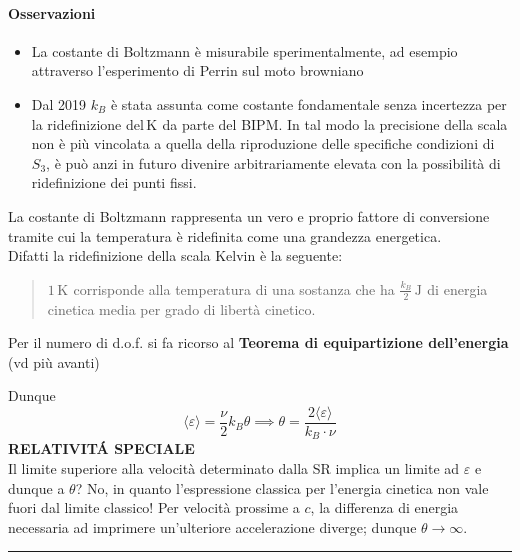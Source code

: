 \documentclass[10pt, oneside]{book}
\newcommand{\kelvin}[1]{\, \mathrm{K^{#1}}}
\newcommand{\joule}[1]{\, \mathrm{J^{#1}}}
\begin{document}
\paragraph{Osservazioni}
\begin{itemize}
\item La costante di Boltzmann è misurabile sperimentalmente, ad esempio attraverso l'esperimento di Perrin sul moto browniano
\item Dal 2019 $k_B$ è stata assunta come costante fondamentale senza incertezza per la ridefinizione del$\kelvin{}$ da parte del BIPM. In tal modo la precisione della scala non è più vincolata a quella della riproduzione delle specifiche condizioni di $S_3$, è può anzi in futuro divenire arbitrariamente elevata con la possibilità di ridefinizione dei punti fissi.
\end{itemize}
La costante di Boltzmann rappresenta un vero e proprio fattore di conversione tramite cui la temperatura è ridefinita come una grandezza energetica.
\\Difatti la ridefinizione della scala Kelvin è la seguente:
\begin{quote}
$1 \kelvin{}$ corrisponde alla temperatura di una sostanza che ha $\displaystyle \frac{k_B}{2} \joule{}$ di energia cinetica media per grado di libertà cinetico.
\end{quote}
Per il numero di d.o.f. si fa ricorso al \textbf{Teorema di equipartizione dell'energia} (vd più avanti)
\begin{center}

\end{center}
Dunque
\[\langle \varepsilon \rangle = \frac{\nu}{2} k_B \theta \implies \theta = \frac{2 \langle \varepsilon \rangle}{k_B \cdot \nu}\]
\textbf{RELATIVIT\'A SPECIALE }\hrulefill
\\Il limite superiore alla velocità determinato dalla SR implica un limite ad $\varepsilon$ e dunque a $\theta$? No, in quanto l'espressione classica per l'energia cinetica non vale fuori dal limite classico! Per velocità prossime a $c$, la differenza di energia necessaria ad imprimere un'ulteriore accelerazione diverge; dunque $\theta \rightarrow \infty$.
\\\hrule
\end{document}
